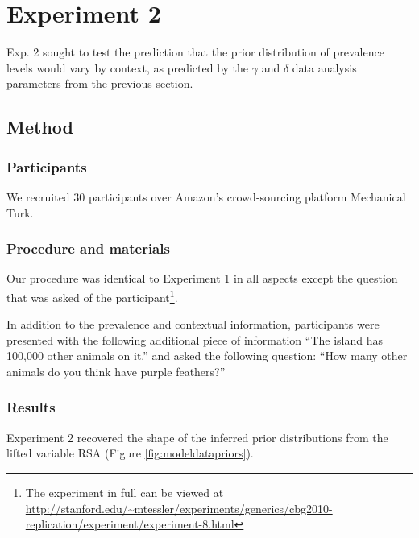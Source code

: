 \documentclass[10pt,letterpaper]{article}
\begin{document}
\section{Experiment 2}

Exp. 2 sought to test the prediction that the prior distribution of prevalence levels would vary by context, as predicted by the $\gamma$ and $\delta$ data analysis parameters from the previous section.

\subsection{Method}

\subsubsection{Participants}

We recruited 30 participants over Amazon's crowd-sourcing platform Mechanical Turk. 

\subsubsection{Procedure and materials}

Our procedure was identical to Experiment 1 in all aspects except the question that was asked of the participant\footnote{The experiment in full can be viewed at \url{http://stanford.edu/~mtessler/experiments/generics/cbg2010-replication/experiment/experiment-8.html}}. 

In addition to the prevalence and contextual information, participants were presented with the following additional piece of information ``The island has 100,000 other animals on it.'' and asked the following question: ``How many other animals do you think have purple feathers?''

\subsubsection{Results}

Experiment 2 recovered the shape of the inferred prior distributions from the lifted variable RSA (Figure \ref{fig:modeldatapriors}).
\end{document}
